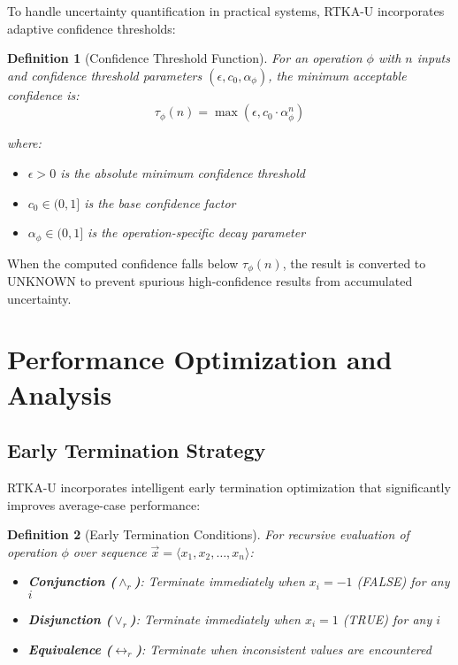 \documentclass[11pt,a4paper]{article}
\newtheorem{definition}{Definition}
\begin{document}
To handle uncertainty quantification in practical systems, RTKA-U incorporates adaptive confidence thresholds:

\begin{definition}[Confidence Threshold Function]
For an operation $\phi$ with $n$ inputs and confidence threshold parameters $(\epsilon, c_0, \alpha_\phi)$, the minimum acceptable confidence is:
\begin{equation}
\tau_\phi(n) = \max\left(\epsilon, c_0 \cdot \alpha_\phi^n\right)
\end{equation}

where:
\begin{itemize}
\item $\epsilon > 0$ is the absolute minimum confidence threshold
\item $c_0 \in (0, 1]$ is the base confidence factor
\item $\alpha_\phi \in (0, 1]$ is the operation-specific decay parameter
\end{itemize}
\end{definition}

When the computed confidence falls below $\tau_\phi(n)$, the result is converted to UNKNOWN to prevent spurious high-confidence results from accumulated uncertainty.

\section{Performance Optimization and Analysis}

\subsection{Early Termination Strategy}

RTKA-U incorporates intelligent early termination optimization that significantly improves average-case performance:

\begin{definition}[Early Termination Conditions]
For recursive evaluation of operation $\phi$ over sequence $\vec{x} = \langle x_1, x_2, \ldots, x_n \rangle$:

\begin{itemize}
\item \textbf{Conjunction ($\land_r$)}: Terminate immediately when $x_i = -1$ (FALSE) for any $i$
\item \textbf{Disjunction ($\lor_r$)}: Terminate immediately when $x_i = 1$ (TRUE) for any $i$  
\item \textbf{Equivalence ($\leftrightarrow_r$)}: Terminate when inconsistent values are encountered
\end{itemize}
\end{definition}
\end{document}
